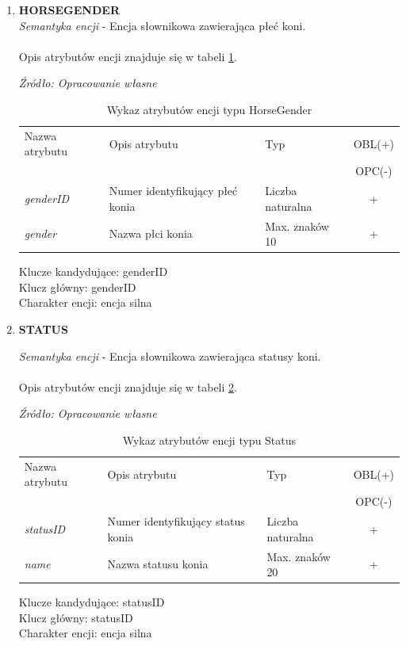 \documentclass[12pt,twoside]{report}
\begin{document}
\begin{enumerate}[start=10,label={\bfseries ENC$\backslash$\arabic*}]
	\item \textbf{HORSEGENDER} \\
	\textit{Semantyka encji} - Encja słownikowa zawierająca płeć koni.
	\\ \\
	Opis atrybutów encji znajduje się w tabeli \ref{HorseGenderAtribute}.
	
	\begin{table}[H]
		\caption{Wykaz atrybutów encji typu HorseGender }
		\textit{Źródło: Opracowanie własne}
		\label{HorseGenderAtribute}
		\centering
		\begin{tabular}{|l|l|l|c|}
			\hline
			Nazwa atrybutu & Opis atrybutu & Typ & OBL(+) \\
			& & &  OPC(-) \\
			\hline
			\textit{genderID} & Numer identyfikujący płeć konia & Liczba naturalna & + \\
			\hline
			\textit{gender} &  Nazwa płci konia & Max. znaków 10 & + \\
			\hline
		\end{tabular}
	\end{table}
	Klucze kandydujące: genderID \\
	Klucz główny: genderID \\
	Charakter encji: encja silna \\
	
	\item \textbf{STATUS}
	
	\textit{Semantyka encji} - Encja słownikowa zawierająca statusy koni.
		\\ \\
	Opis atrybutów encji znajduje się w tabeli \ref{StatusAtribute}.
	
	\begin{table}[H]
		\caption{Wykaz atrybutów encji typu Status}
		\textit{Źródło: Opracowanie własne}
		\label{StatusAtribute}
		\centering
		\begin{tabular}{|l|l|l|c|}
			\hline
			Nazwa atrybutu & Opis atrybutu & Typ & OBL(+) \\
			& & &  OPC(-) \\
			\hline
			\textit{statusID} & Numer identyfikujący status konia & Liczba naturalna & + \\
			\hline
			\textit{name} &  Nazwa statusu konia & Max. znaków 20 & + \\
			\hline
		\end{tabular}
	\end{table}
	Klucze kandydujące: statusID \\
	Klucz główny: statusID \\
	Charakter encji: encja silna \\


\end{enumerate}
\end{document}
